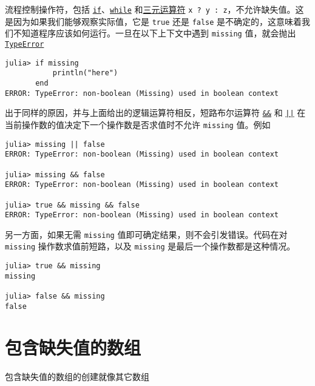 流程控制操作符，包括 \hyperlink{11624168233949720742}{\texttt{if}}、\hyperlink{15133348314455964692}{\texttt{while}} 和\hyperlink{14451148373001501733}{三元运算符} \texttt{x ? y : z}，不允许缺失值。这是因为如果我们能够观察实际值，它是 \texttt{true} 还是 \texttt{false} 是不确定的，这意味着我们不知道程序应该如何运行。一旦在以下上下文中遇到 \texttt{missing} 值，就会抛出 \hyperlink{2622693721821893139}{\texttt{TypeError}}




\begin{verbatim}
julia> if missing
           println("here")
       end
ERROR: TypeError: non-boolean (Missing) used in boolean context
\end{verbatim}



出于同样的原因，并与上面给出的逻辑运算符相反，短路布尔运算符 \hyperlink{4714012140247170866}{\texttt{\&\&}} 和 \hyperlink{2053797086840563251}{\texttt{||}} 在当前操作数的值决定下一个操作数是否求值时不允许 \texttt{missing} 值。例如




\begin{verbatim}
julia> missing || false
ERROR: TypeError: non-boolean (Missing) used in boolean context

julia> missing && false
ERROR: TypeError: non-boolean (Missing) used in boolean context

julia> true && missing && false
ERROR: TypeError: non-boolean (Missing) used in boolean context
\end{verbatim}



另一方面，如果无需 \texttt{missing} 值即可确定结果，则不会引发错误。代码在对 \texttt{missing} 操作数求值前短路，以及 \texttt{missing} 是最后一个操作数都是这种情况。




\begin{verbatim}
julia> true && missing
missing

julia> false && missing
false
\end{verbatim}



\hypertarget{929400294062348079}{}


\section{包含缺失值的数组}



包含缺失值的数组的创建就像其它数组




